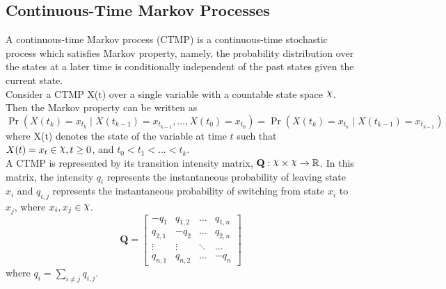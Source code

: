 \subsection{Continuous-Time Markov Processes}
A continuous-time Markov process (CTMP) is a continuous-time stochastic process which satisfies Markov property, namely, the probability distribution over the states at a later time is conditionally independent of the past states given the current state.\cite{Cohn2010a} \\
Consider a CTMP X(t) over a single variable with a countable state space $ \rchi $. Then the Markov property can be written as
\begin{equation}
	\operatorname{Pr}\left(X(t_{k})=x_{t_{k}} \mid X(t_{k-1})=x_{t_{k-1}}, \ldots, X(t_{0})=x_{t_{0}}\right)=\operatorname{Pr}\left(X(t_{k})=x_{t_{k}} \mid X(t_{k-1})=x_{t_{k-1}}\right)
\end{equation}
where X(t) denotes the state of the variable at time $ t $ such that $ X(t)=x_t \in \rchi, t \geq 0$, and $ t_0<t_1<...<t_k $.\\
A CTMP is represented by its transition intensity matrix, $ \textbf{Q} : \rchi \times \rchi \rightarrow \mathbb{R}$. In this matrix, the intensity $ q_{i} $ represents the instantaneous probability of leaving state $ x_{i} $ and $ q_{i,j} $ represents the instantaneous probability of switching from state $ x_{i} $ to $ x_{j} $, where $ x_i, x_j \in \rchi $. 
\begin{equation}
	\textbf{Q} = 
	\begin{bmatrix}
	-q_{1} & q_{1,2} & 	{\hdots}  & q_{1,n} \\
	q_{2,1} & -q_{2} & 	{\hdots}  & q_{2,n}  \\
	{\vdots}  & 	{\vdots}  & 	{\ddots}  & {\hdots}  \\
	q_{n,1} &  q_{n,2} &  {\hdots} & -q_{n}
	\end{bmatrix}
\label{eq:Q_matrix}
\end{equation}
where $ q_{i} = \sum_{i \neq j} q_{i,j}$.\cite{Nodelman1995}


